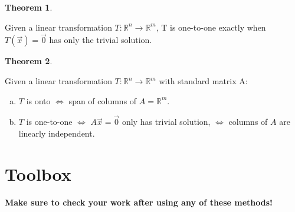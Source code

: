 \documentclass[a4paper,12pt]{article}
\theoremstyle{definition}
\newtheorem{theorem}{Theorem}
\theoremstyle{definition}
\newcommand{\mateq}[3]{#1#2 = #3}
\begin{document}
	\begin{theorem}
		\label{thm:lin-trans-one-to-one-thm}
		
		Given a linear transformation $T: \mathbb{R}^n \rightarrow \mathbb{R}^m$, T is one-to-one exactly when $\mateq{T}{(\vec{x})}{\vec{0}}$ has only the trivial solution.
	\end{theorem}
	
	\begin{theorem}
		\label{thm:onto-and-one-to-one-thm}
		
		Given a linear transformation $T: \mathbb{R}^n \rightarrow \mathbb{R}^m$ with standard matrix A:
		\begin{enumerate}[a.]
			\item $T$ is onto $\Leftrightarrow$ span of columns of $A = \mathbb{R}^m$.
			
			\item $T$ is one-to-one $\Leftrightarrow$ $\mateq{A}{\vec{x}}{\vec{0}}$ only has trivial solution, $\Leftrightarrow$ columns of $A$ are linearly independent.
		\end{enumerate}
	\end{theorem}
	\newpage
	
	\section{Toolbox}
	\textbf{Make sure to check your work after using any of these methods!}
	
\end{document}
